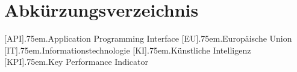 
\section*{Abkürzungsverzeichnis}
{\protect\thispagestyle{fancy}}

\vspace{0.25cm}

\begin{onehalfspace}
	\newcommand{\acroformat}[2]{\textbf{#1}\dotfill \nobreak\hspace{0.5em}#2}

	\makeatletter
	\renewcommand{\dotfill}{\leavevmode \cleaders \hb@xt@ .75em{\hss .\hss }\hfill \kern \z@}
	\makeatother


	\begin{acronym}
		[API]{\acroformat{}{Application Programming Interface}}
		[EU]{\acroformat{}{Europäische Union}}
		[IT]{\acroformat{}{Informationstechnologie}}
		[KI]{\acroformat{}{Künstliche Intelligenz}}
		[KPI]{\acroformat{}{Key Performance Indicator}}
	\end{acronym}
\end{onehalfspace}
